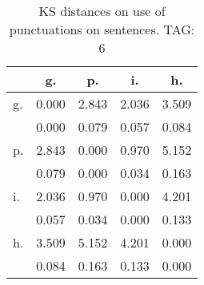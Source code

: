 \begin{table}[h!]
\begin{center}
\begin{tabular}{| l | c | c | c | c |}\hline
 & g. & p. & i. & h. \\\hline
g. & 0.000  & 2.843  & 2.036  & 3.509 \\\hline
 & 0.000  & 0.079  & 0.057  & 0.084 \\\hline
p. & 2.843  & 0.000  & 0.970  & 5.152 \\\hline
 & 0.079  & 0.000  & 0.034  & 0.163 \\\hline
i. & 2.036  & 0.970  & 0.000  & 4.201 \\\hline
 & 0.057  & 0.034  & 0.000  & 0.133 \\\hline
h. & 3.509  & 5.152  & 4.201  & 0.000 \\\hline
 & 0.084  & 0.163  & 0.133  & 0.000 \\\hline
\end{tabular}
\caption{KS distances on use of punctuations on sentences. TAG: 6}
\end{center}
\end{table}